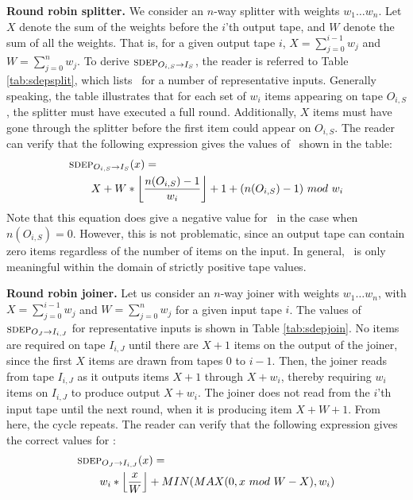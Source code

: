 {\bf Round robin splitter.}  We consider an $n$-way splitter with
weights $w_1 \dots w_n$.  Let $X$ denote the sum of the weights before
the $i$'th output tape, and $W$ denote the sum of all the weights.
That is, for a given output tape $i$, $X = \sum_{j=0}^{i-1} w_j$ and
$W = \sum_{j=0}^n w_j$.  To derive $\mi{I_S}{O_{i,S}}$, the reader is
referred to Table \ref{tab:sdepsplit}, which lists \sdep~for a number
of representative inputs.  Generally speaking, the table illustrates
that for each set of $w_i$ items appearing on tape $O_{i,S}$, the
splitter must have executed a full round.  Additionally, $X$ items
must have gone through the splitter before the first item could appear
on $O_{i,S}$.  The reader can verify that the following expression
gives the values of \sdep~shown in the table:
\begin{align}
\protect\label{eq:sdepsplit}
&\mi{I_S}{O_{i,S}}(x) = \\ &~~~~~~X +
W*\left\lfloor\frac{n(O_{i,S})-1}{w_i}\right\rfloor + 1 +
(n(O_{i,S})-1)~mod~w_i \nonumber
\end{align}
Note that this equation does give a negative value for \sdep~in the
case when $n(O_{i,S}) = 0$.  However, this is not problematic, since
an output tape can contain zero items regardless of the number of
items on the input.  In general, \sdep~is only meaningful within the
domain of strictly positive tape values.

{\bf Round robin joiner.}  Let us consider an $n$-way joiner with
weights $w_1 \dots w_n$, with $X = \sum_{j=0}^{i-1} w_j$ and $W =
\sum_{j=0}^n w_j$ for a given input tape $i$.  The values of
$\mi{I_{i,J}}{O_J}$ for representative inputs is shown in Table
\ref{tab:sdepjoin}.  No items are required on tape $I_{i,J}$ until
there are $X+1$ items on the output of the joiner, since the first $X$
items are drawn from tapes $0$ to $i-1$.  Then, the joiner reads from
tape $I_{i,J}$ as it outputs items $X+1$ through $X+w_i$, thereby
requiring $w_i$ items on $I_{i,J}$ to produce output $X+w_i$.  The
joiner does not read from the $i$'th input tape until the next round,
when it is producing item $X + W + 1$.  From here, the cycle repeats.
The reader can verify that the following expression gives the correct
values for \sdep:
\begin{align}
\protect\label{eq:sdepjoin}
&\mi{I_{i,J}}{O_J}(x) = \\ &~~~~~~w_i *
\left\lfloor\frac{x}{W}\right\rfloor + MIN(MAX(0, x~mod~W - X), w_i) \nonumber
\end{align}

